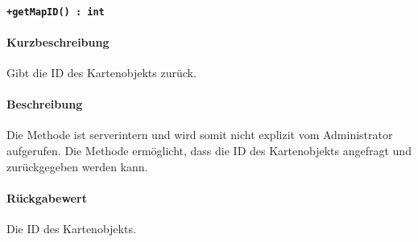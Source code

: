 \paragraph*{\texttt{+getMapID() : int}}%
\paragraph*{Kurzbeschreibung}
Gibt die ID des Kartenobjekts zurück.
\paragraph*{Beschreibung}
Die Methode ist serverintern und wird somit nicht explizit vom Administrator aufgerufen.
Die Methode ermöglicht, dass die ID des Kartenobjekts angefragt und zurückgegeben werden kann.
\paragraph*{Rückgabewert}
Die ID des Kartenobjekts.
